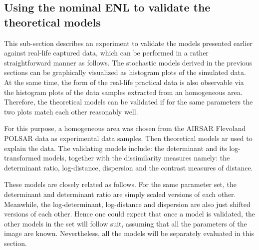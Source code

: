 \documentclass[journal]{IEEEtran}
\begin{document}
\subsection{Using the nominal ENL to validate the theoretical models} 
This sub-section describes an experiment to validate the models presented earlier against real-life captured data,
  which can be performed in a rather straightforward manner as follows.
The stochastic models derived in the previous sections can be graphically visualized as histogram plots of the simulated data.
At the same time, the form of the real-life practical data is also observable via the histogram plots of the data samples extracted from an homogeneous area.
Therefore, the theoretical models can be validated 
  if for the same parameters 
  the two plots match each other reasonably well.

For this purpose, a homogeneous area was chosen from the AIRSAR Flevoland POLSAR data as experimental data samples.
Then theoretical models ar used  to explain the data.
The validating models include:
  the determinant and its log-transformed models, together with the dissimilarity measures namely: the determinant ratio, log-distance, dispersion and the contrast measures of distance.
  
These models are closely related as follows.
For  the same parameter set, the determinant and determinant ratio are simply scaled versions of each other.
Meanwhile, the log-determinant, log-distance and dispersion are also just shifted versions of each other.
Hence one could expect that 
  once a model is validated, the other models in the set will follow suit, 
  assuming that all the parameters of the image are known.%
Nevertheless, all the models will be separately evaluated in this section.
\end{document}
